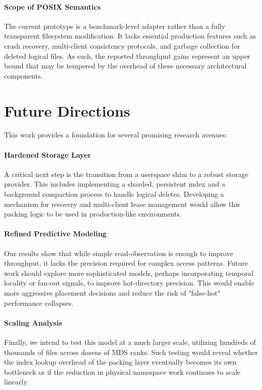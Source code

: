 \documentclass[letterpaper,twocolumn,10pt]{article}
\begin{document}
\paragraph{Scope of POSIX Semantics} The current prototype is a benchmark-level adapter rather than a fully transparent filesystem modification. It lacks essential production features such as crash recovery, multi-client consistency protocols, and garbage collection for deleted logical files. As such, the reported throughput gains represent an upper bound that may be tempered by the overhead of these necessary architectural components.

\section{Future Directions}

This work provides a foundation for several promising research avenues:

\paragraph{Hardened Storage Layer} A critical next step is the transition from a userspace shim to a robust storage provider. This includes implementing a sharded, persistent index and a background compaction process to handle logical deletes. Developing a mechanism for recovery and multi-client lease management would allow this packing logic to be used in production-like environments.

\paragraph{Refined Predictive Modeling} Our results show that while simple read-observation is enough to improve throughput, it lacks the precision required for complex access patterns. Future work should explore more sophisticated models, perhaps incorporating temporal locality or fan-out signals, to improve hot-directory precision. This would enable more aggressive placement decisions and reduce the risk of "false-hot" performance collapses.

\paragraph{Scaling Analysis} Finally, we intend to test this model at a much larger scale, utilizing hundreds of thousands of files across dozens of MDS ranks. Such testing would reveal whether the index lookup overhead of the packing layer eventually becomes its own bottleneck or if the reduction in physical namespace work continues to scale linearly.
\end{document}

